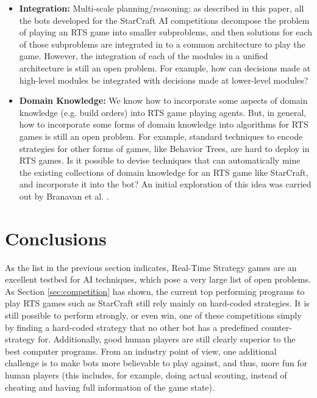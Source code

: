 \documentclass[journal]{IEEEtran}
\begin{document}
\begin{itemize}
\item {\bf Integration:}
Multi-scale planning/reasoning: as described in this paper, all the bots developed for the StarCraft AI competitions decompose the problem of playing an RTS game into smaller subproblems, and then solutions for each of those subproblems are integrated in to a common architecture to play the game. However, the integration of each of the modules in a unified architecture is still an open problem. For example, how can decisions made at high-level modules be integrated with decisions made at lower-level modules? 

\item {\bf Domain Knowledge: }
We know how to incorporate some aspects of domain knowledge (e.g. build orders) into RTS game playing agents. But, in general, how to incorporate some forms of domain knowledge into algorithms for RTS games is still an open problem. For example, standard techniques to encode strategies for other forms of games, like Behavior Trees, are hard to deploy in RTS games. Is it possible to devise techniques that can automatically mine the existing collections of domain knowledge for an RTS game like StarCraft, and incorporate it into the bot? An initial exploration of this idea was carried out by Branavan et al. \cite{branavan2011learning}.
\end{itemize}



%

\section{Conclusions}\label{sec:conclusions}

As the list in the previous section indicates, Real-Time Strategy games are an excellent testbed for AI techniques, which pose a very large list of open problems. As Section \ref{sec:competition} has shown, the current top performing programs to play RTS games such as StarCraft still rely mainly on hard-coded strategies. It is still possible to perform strongly, or even win, one of these competitions simply by finding a hard-coded strategy that no other bot has a predefined counter-strategy for. Additionally, good human players are still clearly superior to the best computer programs. From an industry point of view, one additional challenge is to make bots more believable to play against, and thus, more fun for human players (this includes, for example, doing actual scouting, instead of cheating and having full information of the game state).
\end{document}
